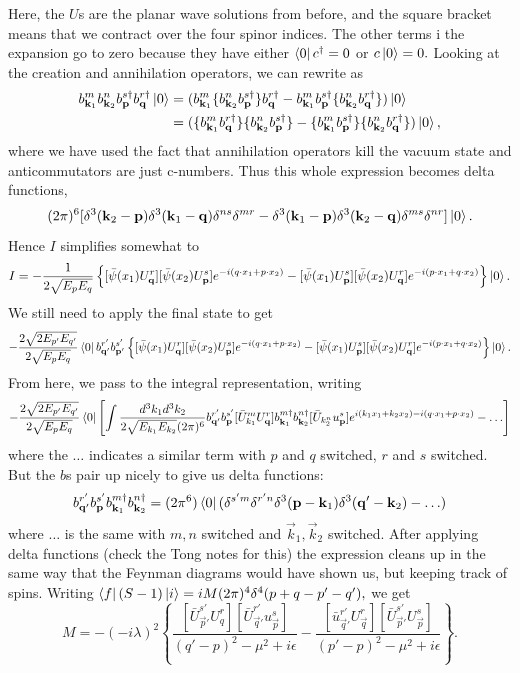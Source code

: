 Here, the $U$s are the planar wave solutions from before, and the square bracket means that we contract over the four spinor indices. The other terms i the expansion go to zero because they have either $\left< 0 \right|c^\dagger=0$ or $c\left| 0 \right>=0.$ Looking at the creation and annihilation operators, we can rewrite as
\begin{align*}
    b_{\boldsymbol{\mathbf{k}}_1}^m b_{\boldsymbol{\mathbf{k}}_2}^n b_{\boldsymbol{\mathbf{p}}}^{s\dagger}b_{\boldsymbol{\mathbf{q}}}^{r\dagger}\left| 0 \right> &=(b_{\boldsymbol{\mathbf{k}}_1}^m \{b_{\boldsymbol{\mathbf{k}}_2}^n b_{\boldsymbol{\mathbf{p}}}^{s\dagger}\}b_{\boldsymbol{\mathbf{q}}}^{r\dagger}
    -b_{\boldsymbol{\mathbf{k}}_1}^m b_{\boldsymbol{\mathbf{p}}}^{s\dagger} \{b_{\boldsymbol{\mathbf{k}}_2}^{n}b_{\boldsymbol{\mathbf{q}}}^{r\dagger}\})\left| 0 \right>\\
    &=(\{b_{\boldsymbol{\mathbf{k}}_1}^m b_{\boldsymbol{\mathbf{q}}}^{r\dagger}\}\{b_{\boldsymbol{\mathbf{k}}_2}^n b_{\boldsymbol{\mathbf{p}}}^{s\dagger}\}
    -\{b_{\boldsymbol{\mathbf{k}}_1}^m b_{\boldsymbol{\mathbf{p}}}^{s\dagger}\} \{b_{\boldsymbol{\mathbf{k}}_2}^{n}b_{\boldsymbol{\mathbf{q}}}^{r\dagger}\})\left| 0 \right>,
\end{align*}
where we have used the fact that annihilation operators kill the vacuum state and anticommutators are just c-numbers. Thus this whole expression becomes delta functions,
$$(2\pi)^6 [\delta^3 (\boldsymbol{\mathbf{k}}_2 -\boldsymbol{\mathbf{p}})\delta^3 (\boldsymbol{\mathbf{k}}_1-\boldsymbol{\mathbf{q}})\delta^{ns}\delta^{mr}-\delta^3 (\boldsymbol{\mathbf{k}}_1-\boldsymbol{\mathbf{p}}) \delta^3(\boldsymbol{\mathbf{k}}_2-\boldsymbol{\mathbf{q}})\delta^{ms}\delta^{nr}]\left| 0 \right>.$$
Hence $I$ simplifies somewhat to
$$I=-\frac{1}{2\sqrt{E_pE_q}}\left\{[\bar \psi(x_1)U_{\boldsymbol{\mathbf{q}}}^r][\bar\psi(x_2)U_{\boldsymbol{\mathbf{p}}}^s] e^{-i(q\cdot x_1 +p\cdot x_2)}
-[\bar \psi(x_1)U_{\boldsymbol{\mathbf{p}}}^s][\bar\psi(x_2)U_{\boldsymbol{\mathbf{q}}}^r] e^{-i(p\cdot x_1 +q\cdot x_2)}\right\}\left| 0 \right>.$$
We still need to apply the final state to get
$$-\frac{2\sqrt{2 E_{p'}E_{q'}}}{2\sqrt{E_pE_q}} \left< 0 \right|b_{\boldsymbol{\mathbf{q}}'}^{r'}b_{\boldsymbol{\mathbf{p}}'}^{s'}
\left\{[\bar \psi(x_1)U_{\boldsymbol{\mathbf{q}}}^r][\bar\psi(x_2)U_{\boldsymbol{\mathbf{p}}}^s] e^{-i(q\cdot x_1 +p\cdot x_2)}
-[\bar \psi(x_1)U_{\boldsymbol{\mathbf{p}}}^s][\bar\psi(x_2)U_{\boldsymbol{\mathbf{q}}}^r] e^{-i(p\cdot x_1 +q\cdot x_2)}\right\}\left| 0 \right>.$$
From here, we pass to the integral representation, writing
$$-\frac{2\sqrt{2 E_{p'}E_{q'}}}{2\sqrt{E_pE_q}} \left< 0 \right|\left[ \int \frac{d^3k_1 d^3k_2}{2\sqrt{E_{k_1}E_{k_2}}(2\pi)^6} b_{\boldsymbol{\mathbf{q}}'}^{r'}b_{\boldsymbol{\mathbf{p}}}^{s'}[\bar U_{k_1}^m U_{\boldsymbol{\mathbf{q}}}^r] b_{\boldsymbol{\mathbf{k}}_1}^{m\dagger} b_{\boldsymbol{\mathbf{k}}_2}^{n\dagger} [\bar U_{k_2^n}u_{\boldsymbol{\mathbf{p}}}^s] e^{i(k_1x_1+k_2x_2)-i(q\cdot x_1 +p\cdot x_2)}-\ldots\right]$$
where the $\ldots$ indicates a similar term with $p$ and $q$ switched, $r$ and $s$ switched.
But the $b$s pair up nicely to give us delta functions:
$$b_{\boldsymbol{\mathbf{q}}'}^{r'}b_{\boldsymbol{\mathbf{p}}}^{s'} b_{\boldsymbol{\mathbf{k}}_1}^{m\dagger} b_{\boldsymbol{\mathbf{k}}_2}^{n\dagger}=(2\pi^6)\left< 0 \right|(\delta^{s'm}\delta^{r'n}\delta^3(\boldsymbol{\mathbf{p}}- \boldsymbol{\mathbf{k}}_1)\delta^3(\boldsymbol{\mathbf{q}}'-\boldsymbol{\mathbf{k}}_2)-\ldots)$$
where $\ldots$ is the same with $m,n$ switched and $\vec k_1,\vec k_2$ switched. After applying delta functions (check the Tong notes for this) the expression cleans up in the same way that the Feynman diagrams would have shown us, but keeping track of spins. Writing $\left< f \right|(S-1)\left| i \right>=iM(2\pi)^4 \delta^4(p+q-p'-q'),$ we get
\begin{equation}
    M=-(-i\lambda)^2 \left\{ \frac{[\bar U_{\vec p'}^{s'} U_q^r][\bar U_{\vec q'}^{r'}u_{\vec p}^s]}{(q'-p)^2-\mu^2+i\epsilon}
    - \frac{[\bar u_{\vec q'}^{r'}U_{\vec q}^r][\bar U_{\vec p'}^{s'} U_{\vec p}^s]}{(p'-p)^2-\mu^2+i\epsilon}\right\}.
\end{equation}


